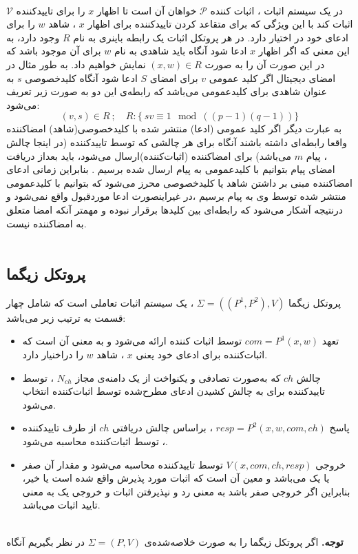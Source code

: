 \\
در یک سیستم اثبات ، اثبات کننده 
$\mathcal{P}$
خواهان آن است تا اظهار 
$x$
را برای تاییدکننده 
$\mathcal{V}$
اثبات کند با این ویژگی که برای متقاعد کردن تاییدکننده برای اظهار
$x$
، شاهد 
$w$
را برای ادعای خود در اختیار دارد. در هر پروتکل اثبات یک رابطه باینری به نام 
$R$
وجود دارد، به این معنی که اگر اظهار
$x$
ادعا ‌شود آنگاه باید شاهدی
به نام 
$w$
برای آن موجود باشد که در این صورت آن را به صورت 
$(x,w) \in R $
نمایش خواهیم داد. به طور مثال در امضای دیجیتال اگر کلید عمومی 
$v$
برای امضای
$S$
ادعا شود آنگاه کلیدخصوصی
$s$
به عنوان شاهدی برای کلیدعمومی می‌باشد که رابطه‌ی این دو به صورت زیر تعریف می‌شود:
$$(v,s) \in R ~ ; \quad R :\{ ~ ‌sv \equiv 1  \mod ( (p-1)(q-1) )  \} $$
به عبارت دیگر اگر کلید عمومی (ادعا) منتشر شده با کلیدخصوصی(شاهد)  امضاکننده واقعا رابطه‌ای داشته باشند آنگاه برای هر چالشی که توسط تاییدکننده (در اینجا چالش ، پیام 
$m$
می‌باشد) برای امضاکننده (اثبات‌کننده)ارسال می‌شود، باید بعداز دریافت امضای پیام بتوانیم با کلیدعمومی به پیام ارسال شده برسیم . بنابراین زمانی ادعای امضاکننده مبنی بر داشتن شاهد یا کلیدخصوصی محرز می‌شود که بتوانیم با کلیدعمومی منتشر شده توسط وی به پیام برسیم ،در غیراینصورت ادعا موردقبول واقع نمی‌شود و درنتیجه آشکار می‌شود که رابطه‌ای بین کلیدها برقرار نبوده و مهمتر آنکه امضا متعلق به امضاکننده نیست.
\\
\\
\subsection{پروتکل زیگما}\label{sigma}

 پروتکل زیگما 
$\Sigma = ((P^1,P^2),V)$
، یک سیستم اثبات تعاملی است که شامل چهار قسمت به ترتیب زیر می‌باشد:
\begin{itemize}
\item 
 تعهد
$com = P^1(x,w)$
 توسط اثبات کننده ارائه می‌شود و به معنی آن است که اثبات‌کننده برای ادعای خود یعنی
 $x$
 ، شاهد 
 $w$
 را دراخنیار دارد.
\item 
 چالش 
$ch$
که به‌صورت  تصادفی و یکنواخت از یک دامنه‌ی مجاز
$N_{ch}$
، توسط تاییدکننده برای به چالش کشیدن ادعای مطرح‌شده توسط اثبات‌کننده انتخاب می‌شود. 
\item 
 پاسخ 
$resp = P^2(x,w,com,ch)$
 ، براساس چالش دریافتی  
$ch$
از طرف تایید‌کننده ، توسط اثبات‌کننده محاسبه می‌شود.
\item
خروجی 
$V(x,com,ch,resp)$
 توسط تاییدکننده محاسبه می‌شود و مقدار آن  صفر یا یک می‌باشد و معین آن است که  اثبات مورد پذیرش  واقع شده است یا خیر، بنابراین اگر خروجی صفر باشد به معنی رد و نپذیرفتن اثبات و خروجی یک به معنی تایید اثبات می‌باشد. 
	
\end{itemize}~
\\
\textbf{توجه.}
اگر پروتکل زیگما را به صورت خلاصه‌شده‌ی
$\Sigma = (P,V)$
در نظر بگیریم آنگاه

